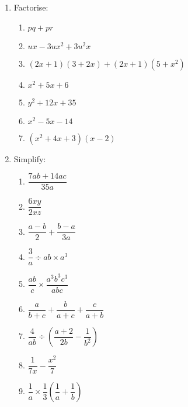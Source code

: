 \documentclass{amsbook}
\begin{document}
\begin{enumerate}
\begin{enumerate}
    \end{enumerate}
  \item Factorise:
    \begin{enumerate}
      \item $ pq + pr $
      \item $ ux - 3ux^2 + 3u^2 x $
      \item $ (2x + 1)(3 + 2x) + (2x + 1)(5 + x^2) $
      \item $ x^2 + 5x + 6 $
      \item $ y^2 + 12x + 35 $
      \item $ x^2 - 5x - 14 $
      \item $ (x^2 + 4x + 3)(x - 2) $
    \end{enumerate}
  \item Simplify:
    \begin{enumerate}
      \item $ \dfrac{7ab + 14ac}{35a} $
      \item $ \dfrac{6xy}{2xz} $
      \item $ \dfrac{a - b}{2} + \dfrac{b - a}{3a} $
      \item $ \dfrac{3}{a} \div ab \times a^3 $
      \item $ \dfrac{ab}{c} \times \dfrac{a^3 b^3 c^3}{abc} $
      \item $ \dfrac{a}{b + c} + \dfrac{b}{a + c} + \dfrac{c}{a + b} $
      \item $ \dfrac{4}{ab} \div \left( \dfrac{a + 2}{2b} - \dfrac{1}{b^2} \right) $
      \item $ \dfrac{1}{7x} - \dfrac{x^2}{7} $
      \item $ \dfrac{1}{a} \times \dfrac{1}{3} \left( \dfrac{1}{a} + \dfrac{1}{b} \right) $
    \end{enumerate}
\end{enumerate}
\end{document}
